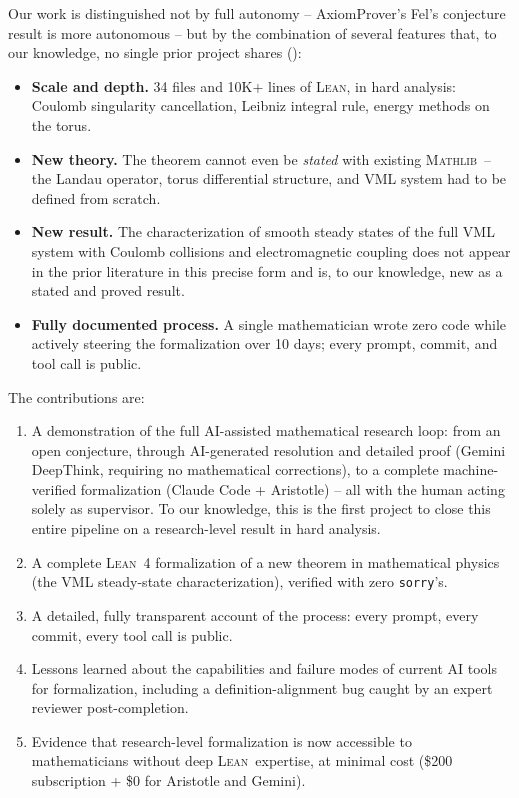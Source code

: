 \documentclass[11pt]{article}
\newcommand{\lean}{\textsc{Lean}}
\newcommand{\mathlib}{\textsc{Mathlib}}
\newcommand{\sorry}{\texttt{sorry}}
\begin{document}
Our work is distinguished not by full autonomy -- AxiomProver's Fel's conjecture result is more autonomous -- but by the combination of several features that, to our knowledge, no single prior project shares ():
\begin{itemize}[leftmargin=2em,topsep=4pt,itemsep=2pt]
  \item \textbf{Scale and depth.} 34 files and 10K+ lines of \lean, in hard analysis: Coulomb singularity cancellation, Leibniz integral rule, energy methods on the torus.
  \item \textbf{New theory.} The theorem cannot even be \emph{stated} with existing \mathlib\ -- the Landau operator, torus differential structure, and VML system had to be defined from scratch.
  \item \textbf{New result.} The characterization of smooth steady states of the full VML system with Coulomb collisions and electromagnetic coupling does not appear in the prior literature in this precise form and is, to our knowledge, new as a stated and proved result.
  \item \textbf{Fully documented process.} A single mathematician wrote zero code while actively steering the formalization over 10 days; every prompt, commit, and tool call is public.
\end{itemize}

The contributions are:
\begin{enumerate}[leftmargin=2em]
  \item A demonstration of the full AI-assisted mathematical research loop: from an open conjecture, through AI-generated resolution and detailed proof (Gemini DeepThink, requiring no mathematical corrections), to a complete machine-verified formalization (Claude Code + Aristotle) -- all with the human acting solely as supervisor. To our knowledge, this is the first project to close this entire pipeline on a research-level result in hard analysis.
  \item A complete \lean~4 formalization of a new theorem in mathematical physics (the VML steady-state characterization), verified with zero \sorry's.
  \item A detailed, fully transparent account of the process: every prompt, every commit, every tool call is public.
  \item Lessons learned about the capabilities and failure modes of current AI tools for formalization, including a definition-alignment bug caught by an expert reviewer post-completion.
  \item Evidence that research-level formalization is now accessible to mathematicians without deep \lean\ expertise, at minimal cost (\$200 subscription + \$0 for Aristotle and Gemini).
\end{enumerate}
\end{document}
